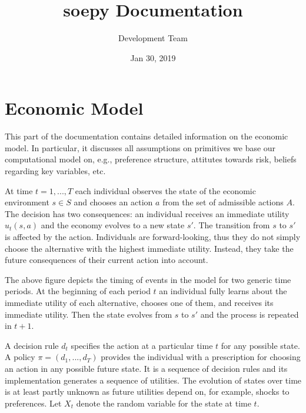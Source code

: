 \documentclass[letterpaper,10pt,english]{sphinxmanual}
\title{soepy Documentation}
\date{Jan 30, 2019}
\author{Development Team}
\begin{document}
\pagestyle{empty}
\sphinxmaketitle
\pagestyle{plain}
\sphinxtableofcontents
\pagestyle{normal}
\label{\detokenize{index::doc}}



\chapter{Economic Model}
\label{\detokenize{economic_model:economic-model}}\label{\detokenize{economic_model::doc}}
This part of the documentation contains detailed information on the economic model. In particular, it discusses all assumptions on primitives we base our computational model on, e.g., preference structure, attitutes towards risk, beliefs regarding key variables, etc.

At time \(t= 1,..., T\) each individual observes the state of the economic environment \(s \in S\) and chooses an action \(a\) from the set of admissible actions \(A\). The decision has two consequences: an individual receives an immediate utility \(u_t(s,a)\) and the economy evolves to a new state \(s'\). The transition from \(s\) to \(s'\) is affected by the action. Individuals are forward-looking, thus they do not simply choose the alternative with the highest immediate utility. Instead, they take the future consequences of their current action into account.

\noindent{}

The above figure depicts the timing of events in the model for two generic time periods. At the beginning of each period \(t\) an individual fully learns about the immediate utility of each alternative, chooses one of them, and receives its immediate utility. Then the state evolves from \(s\) to \(s'\) and the process is repeated in \(t + 1\).

A decision rule \(d_t\) specifies the action at a particular time \(t\) for any possible state. A policy \(\pi = (d_1,..., d_T)\) provides the individual with a prescription for choosing an action in any possible future state. It is a sequence of decision rules and its implementation generates a sequence of utilities. The evolution of states over time is at least partly unknown as future utilities depend on, for example, shocks to preferences. Let \(X_t\) denote the random variable for the state at time \(t\).
\end{document}
